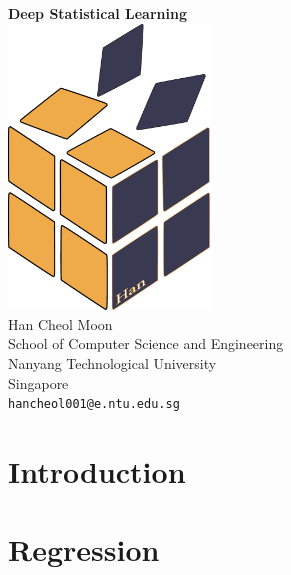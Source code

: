 \documentclass[oneside, a4paper,11pt]{book}
\begin{document}
\begin{titlepage}
	\begin{center}
		\vspace*{5.5cm}
		\textbf{\Huge Deep Statistical Learning}\\
        \vspace{2.5cm}
		\includegraphics[width=0.4\textwidth]{./logo/new_logo.pdf}\\
        \vspace{1.5cm}
        \vspace{1.5cm}
		Han Cheol Moon\\
		School of Computer Science and Engineering\\
		Nanyang Technological University\\
		Singapore\\
		\texttt{hancheol001@e.ntu.edu.sg}
		\date{\today}
	\end{center}
\end{titlepage}

\tableofcontents
\newpage

\mainmatter
\part{Introduction}





\part{Regression}

\end{document}
